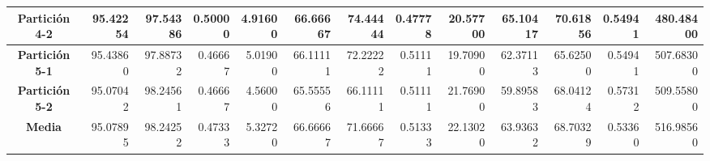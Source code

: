 \documentclass[a4paper,11pt]{article}
\begin{document}
\begin{table}[H]
\begin{adjustbox}{width=1.1\textwidth}
\begin{tabular}{|c|r|r|r|r|r|r|r|r|r|r|r|r|}
  \textbf{Partición 4-2} & 95.42254 & 97.54386 & 0.50000 & 4.91600 & 66.66667 & 74.44444 & 0.47778 & 20.57700 & 65.10417 & 70.61856 & 0.54941 & 480.48400 \\ \hline
  \textbf{Partición 5-1} & 95.43860 & 97.88732 & 0.46667 & 5.01900 & 66.11111 & 72.22222 & 0.51111 & 19.70900 & 62.37113 & 65.62500 & 0.54941 & 507.68300 \\ \hline
  \textbf{Partición 5-2} & 95.07042 & 98.24561 & 0.46667 & 4.56000 & 65.55556 & 66.11111 & 0.51111 & 21.76900 & 59.89583 & 68.04124 & 0.57312 & 509.55800 \\ \hline
  \textbf{Media} & 95.07895 & 98.24252 & 0.47333 & 5.32720 & 66.66667 & 71.66667 & 0.51333 & 22.13020 & 63.93632 & 68.70329 & 0.53360 & 516.98560 \\ \hline
  \end{tabular}
  \end{adjustbox}
  \label{BMB}
  \end{table}
\end{document}
